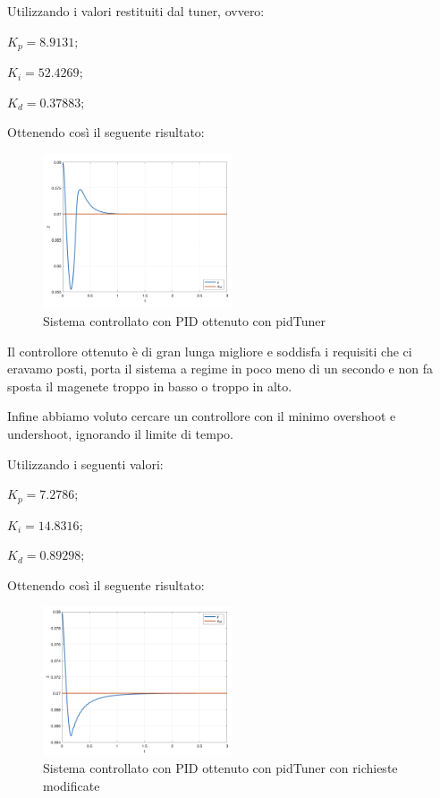 \documentclass{article}
\newcommand{\spacer}[1][8pt]{
    \par\vspace{#1}
}
\begin{document}
Utilizzando i valori restituiti dal tuner, ovvero:

$K_p = 8.9131;$

$K_i = 52.4269;$

$K_d = 0.37883;$

\spacer
Ottenendo così il seguente risultato:

\begin{figure}[H]
    \centering
    \includegraphics[width = 0.5\textwidth]{Images/PID-tuner.png}
    \caption{Sistema controllato con PID ottenuto con pidTuner}
    \label{fig:pidTuner-PID}
\end{figure}

Il controllore ottenuto è di gran lunga migliore e soddisfa i requisiti che ci eravamo posti, porta il sistema a regime in poco meno di un secondo e non fa sposta il magenete troppo in basso o troppo in alto.

\spacer
Infine abbiamo voluto cercare un controllore con il minimo overshoot e undershoot, ignorando il limite di tempo.

Utilizzando i seguenti valori:

$K_p = 7.2786;$

$K_i = 14.8316;$

$K_d = 0.89298;$

\spacer
Ottenendo così il seguente risultato:

\begin{figure}[H]
    \centering
    \includegraphics[width = 0.5\textwidth]{Images/PID-tuner-no-overshoot.png}
    \caption{Sistema controllato con PID ottenuto con pidTuner con richieste modificate}
    \label{fig:pidTuner-PID-no-overshoot}
\end{figure}
\end{document}
